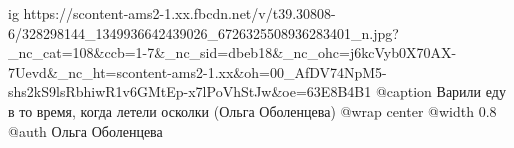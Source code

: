  
 
 
 
 


\ifcmt
  ig https://scontent-ams2-1.xx.fbcdn.net/v/t39.30808-6/328298144_1349936642439026_6726325508936283401_n.jpg?_nc_cat=108&ccb=1-7&_nc_sid=dbeb18&_nc_ohc=j6kcVyb0X70AX-7Uevd&_nc_ht=scontent-ams2-1.xx&oh=00_AfDV74NpM5-shs2kS9lsRbhiwR1v6GMtEp-x7lPoVhStJw&oe=63E8B4B1
	@caption Варили еду в то время, когда летели осколки (Ольга Оболенцева)
  @wrap center
  @width 0.8
	@auth Ольга Оболенцева
\fi
